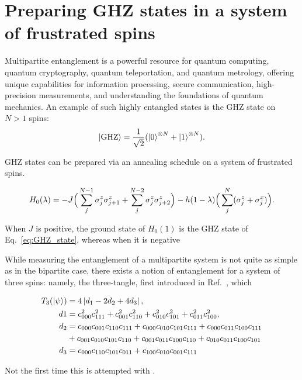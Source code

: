 \section{Preparing GHZ states in a system of frustrated spins}\label{sec:6.4_ghz_states}

Multipartite entanglement is a powerful resource for quantum computing, quantum cryptography, quantum teleportation, and quantum metrology, offering unique capabilities for information processing, secure communication, high-precision measurements, and understanding the foundations of quantum mechanics. An example of such highly entangled states is the GHZ state on $N > 1$ spins:
\begin{equation}\label{eq:GHZ_state}
    \ket{\rm GHZ} = \frac{1}{\sqrt{2}} (\ket{0}^{\otimes N} + \ket{1}^{\otimes N}).
\end{equation}

GHZ states can be prepared via an annealing schedule on a system of frustrated spins. 

\begin{equation}\label{eq:ghz_hamiltonian}
    H_0(\lambda) = - J \Big( \sum_{j}^{N-1} \sigma^z_j \sigma^z_{j+1} + \sum_{j}^{N-2} \sigma^z_j \sigma^z_{j+2} \Big) - h(1 - \lambda) \Big( \sum_j^N (\sigma^z_j + \sigma^x_j) \Big).
\end{equation}

When $J$ is positive, the ground state of $H_0(1)$ is the GHZ state of Eq.~\ref{eq:GHZ_state}, whereas when it is negative 

While measuring the entanglement of a multipartite system is not quite as simple as in the bipartite case, there exists a notion of entanglement for a system of three spins: namely, the three-tangle, first introduced in Ref.~\cite{coffman_distributed_2000}, which

\begin{equation}\label{eq:3-tangle}
	\begin{aligned}
		T_3(\ket{\psi}) &= 4 \left| d_1 - 2 d_2 + 4 d_3 \right|, \\
		d1 &= c^2_{000}c^2_{111} + c^2_{001}c^2_{110} + c^2_{010}c^2_{101} + c^2_{011}c^2_{100}, \\
		d_2 &= c_{000}c_{001}c_{110}c_{111} + c_{000}c_{010}c_{101}c_{111} + c_{000}c_{011}c_{100}c_{111} \\
		 &+ c_{001}c_{010}c_{101}c_{110} + c_{001}c_{011}c_{100}c_{110} + c_{010}c_{011}c_{100}c_{101} \\
		d_3 &= c_{000}c_{110}c_{101}c_{011} + c_{100}c_{010}c_{001}c_{111}
	\end{aligned}
\end{equation}

Not the first time this is attempted with . \cite{sun_optimizing_2022}